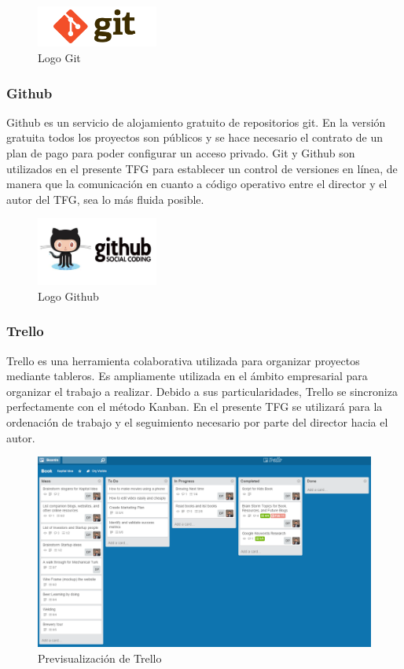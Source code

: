 		\begin{figure}[H]
		\centering
		\includegraphics[width=40mm, fbox={\fboxrule} 4mm]{images/04-metodo/18-git_logo.png}
		\caption{Logo Git}
		\label{fig:git-logo}
		\end{figure}
		
		\subsubsection{Github}
		Github es un servicio de alojamiento gratuito de repositorios git. En la versión gratuita todos los proyectos son públicos y se hace necesario el contrato de un plan de pago para poder configurar un acceso privado.
		Git y Github son utilizados en el presente \ac{TFG} para establecer un control de versiones en línea, de manera que la comunicación en cuanto a código operativo entre el director y el autor del \ac{TFG}, sea lo más fluida posible.
		
		\begin{figure}[H]
		\centering
		\includegraphics[width=40mm, fbox={\fboxrule} 4mm]{images/04-metodo/19-github_logo.jpg}
		\caption{Logo Github}
		\label{fig:github-logo}
		\end{figure}
	
		\subsubsection{Trello}
		Trello es una herramienta colaborativa utilizada para organizar proyectos mediante tableros. Es ampliamente utilizada en el ámbito empresarial para organizar el trabajo a realizar. Debido a sus particularidades, Trello se sincroniza perfectamente con el método Kanban. En el presente \ac{TFG} se utilizará para la ordenación de trabajo y el seguimiento necesario por parte del director hacia el autor.
		
		\begin{figure}[H]
		\centering
		\includegraphics[width=120mm, fbox={\fboxrule} 4mm]{images/04-metodo/20-trello_preview.png}
		\caption{Previsualización de Trello}
		\label{fig:trello-preview}
		\end{figure}
		
